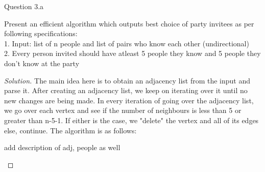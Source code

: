 \begin{solution}{Question 3.a}
    \begin{question}[]
        Present an efficient algorithm which outputs best choice of party invitees as per following specifications:\\
        1. Input: list of n people and list of pairs who know each other (undirectional)\\
        2. Every person invited should have atleast 5 people they know and 5 people they don't know at the party
    \end{question}
    \tcblower{}
    \begin{proof}[Solution]
        The main idea here is to obtain an adjacency list from the input and parse it. After creating an adjacency list, we keep on iterating over it until no new changes are being made. In every iteration of going over the adjacency list, we go over each vertex and see if the number of neighbours is less than 5 or greater than n-5-1. If either is the case, we "delete" the vertex and all of its edges else, continue. The algorithm is as follows: %
        
        add description of adj, people as well
        
        \begin{algorithm}[H]
            \caption{Generate list of invitees for 3.a}
            \begin{algorithmic}[1]
                     
                     
                     
                    \EndFor{}
                     
                    \EndFor{}
                    

\end{algorithmic}
\end{algorithm}
\end{proof}
\end{solution}
